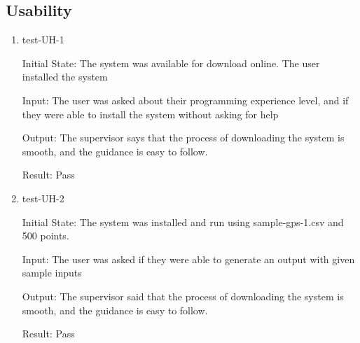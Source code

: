 \documentclass[12pt, titlepage]{article}
\begin{document}
\subsection{Usability}
\begin{enumerate}
\item{test-UH-1} \label{test-UH-1}

Initial State: The system was available for download online. The user installed the system

Input: The user was asked about their programming experience level, and if they were able to install the system without asking for help

Output: The supervisor says that the process of downloading the system is smooth, and the guidance is easy to follow.

Result: Pass

\item{test-UH-2} \label{test-UH-2}

Initial State: The system was installed and run using sample-gps-1.csv and 500 points.

Input: The user was asked if they were able to generate an output with
given sample inputs

Output: The supervisor said that the process of downloading the system is smooth, and the guidance is easy to follow.

Result: Pass

\end{enumerate}
		
\end{document}

